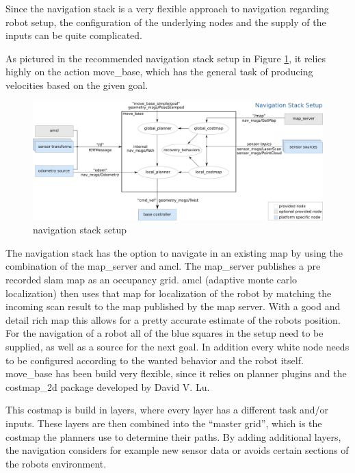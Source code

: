 Since the navigation stack is a very flexible approach to navigation regarding robot setup, the configuration of the underlying nodes and the supply of the inputs can be quite complicated\cite{nav}.

As pictured in the recommended navigation stack setup in Figure \ref{navigation stack setup}, it relies highly on the action move\_base, which has the general task of producing velocities based on the given goal.

\begin{figure}[H]
	\centering
	\includegraphics[width=\textwidth]{Pictures/navigation stack setup}
	\caption{navigation stack setup\cite{movebase}}
	
	\label{navigation stack setup}
\end{figure}

The navigation stack has the option to navigate in an existing map by using the combination of the map\_server and amcl. The map\_server publishes a pre recorded slam map as an occupancy grid. amcl (adaptive monte carlo localization) then uses that map for localization of the robot by matching the incoming scan result to the map published by the map server. With a good and detail rich map this allows for a pretty accurate estimate of the robots position.\\

For the navigation of a robot all of the blue squares in the setup need to be supplied, as well as a source for the next goal. In addition every white node needs to be configured according to the wanted behavior and the robot itself.\\

move\_base has been build very flexible, since it relies on planner plugins and the costmap\_2d package developed by David V. Lu.

This costmap is build in layers, where every layer has a different task and/or inputs. These layers are then combined into the ``master grid'', which is the costmap the planners use to determine their paths\cite{costmappaper}. By adding additional layers, the navigation considers for example new sensor data or avoids certain sections of the robots environment.

